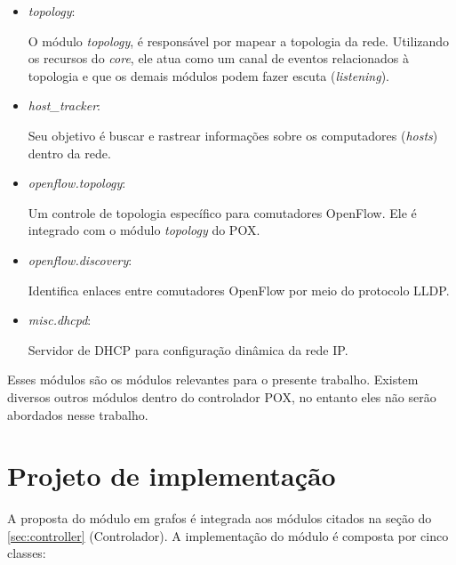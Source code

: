 \begin{itemize}

\item{\emph{topology}}:

O módulo \emph{topology}, é responsável por mapear a topologia da rede.
Utilizando os recursos do \emph{core}, ele atua como um canal de eventos
relacionados à topologia e que os demais módulos podem fazer escuta
(\emph{listening}).

\item{\emph{host\_tracker}}:

Seu objetivo é buscar e rastrear informações sobre os computadores
(\emph{hosts}) dentro da rede.

\item{\emph{openflow.topology}}:

Um controle de topologia específico para comutadores OpenFlow.
Ele é integrado com o módulo \emph{topology} do POX.

\item{\emph{openflow.discovery}}:

Identifica enlaces entre comutadores OpenFlow por meio do protocolo LLDP.

\item{\emph{misc.dhcpd}}:

Servidor de DHCP para configuração dinâmica da rede IP.

\end{itemize}

Esses módulos são os módulos relevantes para o presente trabalho.
Existem diversos outros módulos dentro do controlador POX, no entanto
eles não serão abordados nesse trabalho.

\section{Projeto de implementação}

A proposta do módulo em grafos é integrada aos módulos citados na seção do
\ref{sec:controller} (Controlador).
A implementação do módulo é composta por cinco classes:

